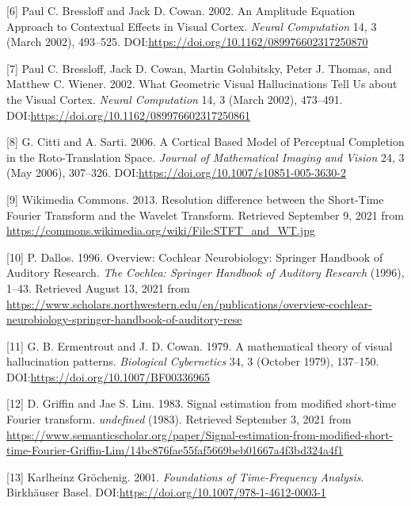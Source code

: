 \documentclass[american,]{article}
\theoremstyle{definition}
\theoremstyle{definition}
\theoremstyle{definition}
\theoremstyle{remark}
\begin{document}
\leavevmode\hypertarget{ref-bressloff2002}{}%
{[}6{]} Paul C. Bressloff and Jack D. Cowan. 2002. An Amplitude Equation Approach to Contextual Effects in Visual Cortex. \emph{Neural Computation} 14, 3 (March 2002), 493--525. DOI:\url{https://doi.org/10.1162/089976602317250870}

\leavevmode\hypertarget{ref-bressloff2002a}{}%
{[}7{]} Paul C. Bressloff, Jack D. Cowan, Martin Golubitsky, Peter J. Thomas, and Matthew C. Wiener. 2002. What Geometric Visual Hallucinations Tell Us about the Visual Cortex. \emph{Neural Computation} 14, 3 (March 2002), 473--491. DOI:\url{https://doi.org/10.1162/089976602317250861}

\leavevmode\hypertarget{ref-citti2006}{}%
{[}8{]} G. Citti and A. Sarti. 2006. A Cortical Based Model of Perceptual Completion in the Roto-Translation Space. \emph{Journal of Mathematical Imaging and Vision} 24, 3 (May 2006), 307--326. DOI:\url{https://doi.org/10.1007/s10851-005-3630-2}

\leavevmode\hypertarget{ref-stft_vs_wt}{}%
{[}9{]} Wikimedia Commons. 2013. Resolution difference between the Short-Time Fourier Transform and the Wavelet Transform. Retrieved September 9, 2021 from \url{https://commons.wikimedia.org/wiki/File:STFT_and_WT.jpg}

\leavevmode\hypertarget{ref-dallos1996}{}%
{[}10{]} P. Dallos. 1996. Overview: Cochlear Neurobiology: Springer Handbook of Auditory Research. \emph{The Cochlea: Springer Handbook of Auditory Research} (1996), 1--43. Retrieved August 13, 2021 from \url{https://www.scholars.northwestern.edu/en/publications/overview-cochlear-neurobiology-springer-handbook-of-auditory-rese}

\leavevmode\hypertarget{ref-ermentrout1979}{}%
{[}11{]} G. B. Ermentrout and J. D. Cowan. 1979. A mathematical theory of visual hallucination patterns. \emph{Biological Cybernetics} 34, 3 (October 1979), 137--150. DOI:\url{https://doi.org/10.1007/BF00336965}

\leavevmode\hypertarget{ref-griffin1983}{}%
{[}12{]} D. Griffin and Jae S. Lim. 1983. Signal estimation from modified short-time Fourier transform. \emph{undefined} (1983). Retrieved September 3, 2021 from \url{https://www.semanticscholar.org/paper/Signal-estimation-from-modified-short-time-Fourier-Griffin-Lim/14bc876fae55faf5669beb01667a4f3bd324a4f1}

\leavevmode\hypertarget{ref-grochenig2001}{}%
{[}13{]} Karlheinz Gröchenig. 2001. \emph{Foundations of Time-Frequency Analysis}. Birkhäuser Basel. DOI:\url{https://doi.org/10.1007/978-1-4612-0003-1}
\end{document}
